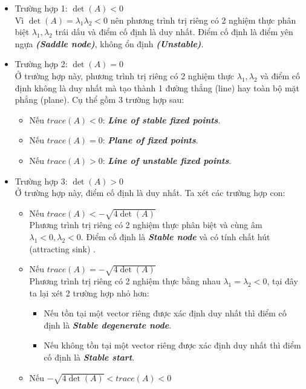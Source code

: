 \begin{itemize}
    \item Trường hợp 1: $\det(A)<0$\\
    Vì $\det(A)=\lambda_1\lambda_2 < 0$ nên phương trình trị riêng có 2 nghiệm thực phân biệt $\lambda_1, \lambda_2$ trái dấu và điểm cố định là duy nhất. Điểm cố định là điểm yên ngựa \textbf{\textit{(Saddle node)}}, không ổn định \textbf{\textit{(Unstable)}}.
    \item Trường hợp 2: $\det(A)=0$\\
    Ở trường hợp này, phương trình trị riêng có 2 nghiệm thực $\lambda_1, \lambda_2$ và điểm cố định không là duy nhất mà tạo thành 1 đường thẳng (line) hay toàn bộ mặt phẳng (plane). Cụ thể gồm 3 trường hợp sau:
    \begin{itemize}
        \item Nếu $trace(A)<0$: \textbf{\textit{Line of stable fixed points}}.
        \item Nếu $trace(A)=0$: \textbf{\textit{Plane of fixed points}}.
        \item Nếu $trace(A)>0$: \textbf{\textit{Line of unstable fixed points}}.
    \end{itemize}
    \item Trường hợp 3: $\det(A)>0$\\
    Ở trường hợp này, điểm cố định là duy nhất. Ta xét các trường hợp con:
    \begin{itemize}
        \item Nếu $trace(A)<-\sqrt{4\det(A)}$\\
        Phương trình trị riêng có 2 nghiệm thực phân biệt và cùng âm $\lambda_1<0, \lambda_2<0$. Điểm cố định là \textbf{\textit{Stable node}} và có tính chất hút (attracting sink) .
        \item Nếu $trace(A)=-\sqrt{4\det(A)}$\\
        Phương trình trị riêng có 2 nghiệm thực bằng nhau $\lambda_1=\lambda_2<0$, tại đây ta lại xét 2 trường hợp nhỏ hơn:
        \begin{itemize}
            \item Nếu tồn tại một vector riêng được xác định duy nhất thì điểm cố định là \textbf{\textit{Stable degenerate node}}.
            \item Nếu không tồn tại một vector riêng được xác định duy nhất thì điểm cố định là \textbf{\textit{Stable start}}.
        \end{itemize}
        \item Nếu $-\sqrt{4\det(A)}<trace(A)<0$\\

\end{itemize}
\end{itemize}
